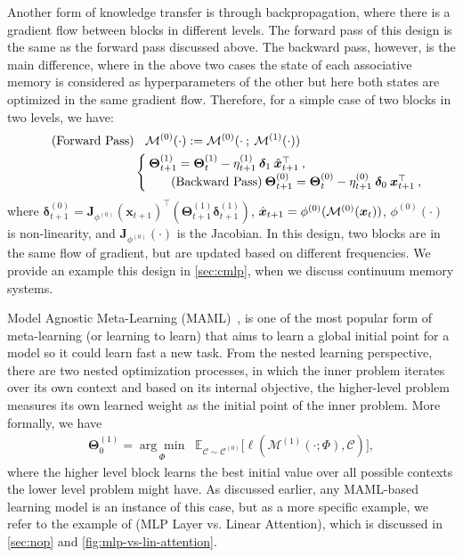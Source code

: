 Another form of knowledge transfer is through backpropagation, where there is a gradient flow between blocks in different levels. The forward pass of this design is the same as the forward pass discussed above. The backward pass, however, is the main difference, where in the above two cases the state of each associative memory is considered as hyperparameters of the other but here both states are optimized in the same gradient flow. Therefore, for a simple case of two blocks in two levels, we have:
\begin{align} \tag{Forward Pass}
    &\:\:\:\:\mathcal{M}^{(0)}(\cdot) := \mathcal{M}^{(0)}(\cdot \:;\: \mathcal{M}^{(1)}(\cdot)) \\ \nonumber
    &\begin{cases}
    \:\boldsymbol{\Theta}^{(1)}_{t+1} = \boldsymbol{\Theta}^{(1)}_{t} - \eta^{(1)}_{t+1} \: \boldsymbol{\delta}_{1} \: \hat{\boldsymbol{x}}_{t+1}^{\top}\:,  \\ \tag{Backward Pass}
    \:\boldsymbol{\Theta}^{(0)}_{t+1} = \boldsymbol{\Theta}^{(0)}_{t} - \eta^{(0)}_{t+1} \: \boldsymbol{\delta}_{0} \: \boldsymbol{x}_{t+1}^{\top}\:,
    \end{cases}
\end{align}
where $\boldsymbol{\delta}^{(0)}_{t+1} = \boldsymbol{J}_{\phi^{(0)}} \left( \boldsymbol{x}_{t+1} \right)^{\top} \left( \boldsymbol{\Theta}^{(1)}_{t+1} \boldsymbol{\delta}^{(1)}_{t+1} \right)$, $\hat{\boldsymbol{x}}_{t+1} = \phi^{(0)}(\mathcal{M}^{(0)}(\boldsymbol{x}_t))$, $\phi^{(0)}(\cdot)$ is non-linearity, and $\boldsymbol{J}_{\phi^{(0)}}(\cdot)$ is the Jacobian. In this design, two blocks are in the same flow of gradient, but are updated based on different frequencies. We provide an example this design in \autoref{sec:cmlp}, when we discuss continuum memory systems. 



Model Agnostic Meta-Learning (MAML)~\citep{finn2017model}, is one of the most popular form of meta-learning (or learning to learn) that aims to learn a global initial point for a model so it could learn fast a new task. From the nested learning perspective, there are two nested optimization processes, in which the inner problem iterates over its own context and based on its internal objective, the higher-level problem measures its own learned weight as the initial point of the inner problem. More formally, we have
\begin{align}
    \boldsymbol{\Theta}^{(1)}_0 =
\underset{\Phi}{\arg\min}
\;\;
\mathbb{E}_{\mathcal{C} \sim \mathcal{C}^{(0)}}
\Biggl[
    \boldsymbol{\ell}(\mathcal{M}^{(1)} \left(\cdot; \Phi\right), \mathcal{C})
\Biggr],
\end{align}
where the higher level block learns the best initial value over all possible contexts the lower level problem might have. As discussed earlier, any MAML-based learning model is an instance of this case, but as a more specific example, we refer to the example of (MLP Layer vs. Linear Attention), which is discussed in \autoref{sec:nop} and \autoref{fig:mlp-vs-lin-attention}. 



